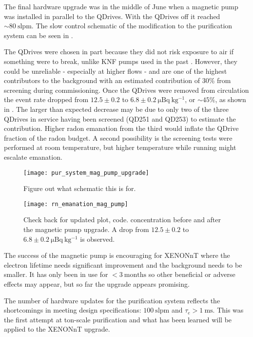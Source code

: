 The final hardware upgrade was in the middle of June when a magnetic pump was installed in parallel to the QDrives.  With the QDrives off
it reached ${\sim} 80\ \mathrm{slpm}$.  The slow control schematic of the modification to the purification system can be seen in
.

The QDrives were chosen in part because they did not risk exposure to air if something were to
break, unlike KNF pumps used in the past .  However, they could be unreliable - especially at higher flows - and
are one of the highest contributors to the 
background with an estimated contribution of 30\% from screening during commissioning.  Once the QDrives were removed from circulation the
 event rate dropped from $12.5 \pm 0.2$ to
$6.8 \pm 0.2\ \mathrm{\mu Bq\ kg^{-1}}$, or ${\sim} 45\%$, as shown in .  The larger
than expected decrease may be due to only two of the three QDrives in service having been screened (QD251 and QD253) to estimate the
contribution.  Higher radon emanation from the third would inflate
the QDrive fraction of the radon budget.  A second possibility is the screening tests were performed at room temperature, but higher
temperature while running might escalate emanation.

\begin{figure}
\centering
\texttt{[image: pur\_system\_mag\_pump\_upgrade]}
\caption{Figure out what schematic this is for.}
\label{fig:electron_lifetime_model_ops_pur_pipes_upgrade}
\end{figure}

\begin{figure}
\centering
\texttt{[image: rn\_emanation\_mag\_pump]}
\caption{Check back for updated plot, code.   concentration before and after the magnetic pump upgrade.  A drop from
$12.5 \pm 0.2$ to $6.8 \pm 0.2\ \mathrm{\mu Bq\ kg^{-1}}$ is observed.}
\label{fig:electron_lifetime_model_ops_rn_emanation}
\end{figure}

The success of the magnetic pump is encouraging for XENONnT where the electron lifetime needs significant improvement and the background
needs to be smaller.  It has only been in use for $< 3\ \mathrm{months}$ so other beneficial or adverse effects may appear, but so
far the upgrade appears promising.

The number of hardware updates for the purification system reflects the shortcomings in meeting design specifications:
$100\ \mathrm{slpm}$ and $\tau_e > 1\ \mathrm{ms}$.  This was the first attempt at ton-scale purification and what has been learned will
be applied to the XENONnT upgrade.



